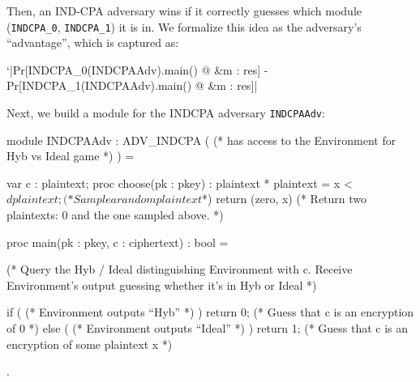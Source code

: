 \documentclass{article}[12pt]
\newcommand{\code}[1]{\texttt{#1}}%
\begin{document}
Then, an IND-CPA adversary wins if it correctly guesses which module (\code{INDCPA\_0}, \code{INDCPA\_1}) it is in. We formalize this idea as the adversary's ``advantage'', which is captured as:

\begin{easycrypt}
`|Pr[INDCPA_0(INDCPAAdv).main() @ &m : res] - Pr[INDCPA_1(INDCPAAdv).main() @ &m : res]|
\end{easycrypt}

Next, we build a module for the INDCPA adversary \code{INDCPAAdv}:

\begin{easycrypt}
module INDCPAAdv : ADV_INDCPA ( (* has access to the Environment for Hyb vs Ideal game *) ) = {
	var c : plaintext;
	proc choose(pk : pkey) : plaintext * plaintext = {
		x <$ dplaintext;	(* Sample a random plaintext $*)
		return (zero, x)	(* Return two plaintexts: 0 and the one sampled above. *)
	}

	proc main(pk : pkey, c : ciphertext) : bool = {
		(* Query the Hyb / Ideal distinguishing Environment with c. Receive Environment's output guessing whether it's in Hyb or Ideal *)

		if ( (* Environment outputs ``Hyb'' *) ) {
			return 0;	(* Guess that c is an encryption of 0 *)
		}
		else ( (* Environment outputs ``Ideal'' *) ) {
			return 1;	(* Guess that c is an encryption of some plaintext x *)
		}

	}
}.
\end{easycrypt}

{\small{


}}
\end{document}

